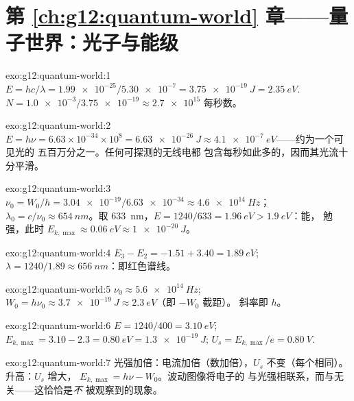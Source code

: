 \section*{第 \ref{ch:g12:quantum-world} 章——量子世界：光子与能级}

\begin{solution}{exo:g12:quantum-world:1}
$E = hc/\lambda = \num{1.99e-25}/\num{5.30e-7} = \qty{3.75e-19}{J} =
\qty{2.35}{eV}$. $N = \num{1.0e-3}/\num{3.75e-19} \approx \num{2.7e15}$
每秒数。
\end{solution}

\begin{solution}{exo:g12:quantum-world:2}
$E = h\nu = 6.63\times10^{-34} \times 10^{8} = \qty{6.63e-26}{J}
\approx \qty{4.1e-7}{eV}$——约为一个可见光的
五百万分之一。任何可探测的无线电都
包含每秒如此多的，因而其光流十分平滑。
\end{solution}

\begin{solution}{exo:g12:quantum-world:3}
$\nu_0 = W_0/h = \num{3.04e-19}/\num{6.63e-34} \approx
\qty{4.6e14}{Hz}$；$\lambda_0 = c/\nu_0 \approx \qty{654}{nm}$。取
\qty{633}{nm}，$E = 1240/633 = \qty{1.96}{eV} > \qty{1.9}{eV}$：能，
勉强，此时 $E_{k,\max} \approx \qty{0.06}{eV} \approx \qty{1e-20}{J}$。
\end{solution}

\begin{solution}{exo:g12:quantum-world:4}
$E_3 - E_2 = -1.51 + 3.40 = \qty{1.89}{eV}$;
$\lambda = 1240/1.89 \approx \qty{656}{nm}$：即红色谱线。
\end{solution}

\begin{solution}{exo:g12:quantum-world:5}
$\nu_0 \approx \qty{5.6e14}{Hz}$; $W_0 = h\nu_0 \approx
\qty{3.7e-19}{J} \approx \qty{2.3}{eV}$（即 $-W_0$ 截距）。
斜率即 $h$。
\end{solution}

\begin{solution}{exo:g12:quantum-world:6}
$E = 1240/400 = \qty{3.10}{eV}$; $E_{k,\max} = 3.10 - 2.3 =
\qty{0.80}{eV} = \qty{1.3e-19}{J}$; $U_s = E_{k,\max}/e =
\qty{0.80}{V}$.
\end{solution}

\begin{solution}{exo:g12:quantum-world:7}
光强加倍：电流加倍（数加倍），$U_s$
不变（每个相同）。升高：$U_s$ 增大，
$E_{k,\max} = h\nu - W_0$。波动图像将电子的
与光强相联系，而与无关——这恰恰是\emph{不}
被观察到的现象。
\end{solution}

